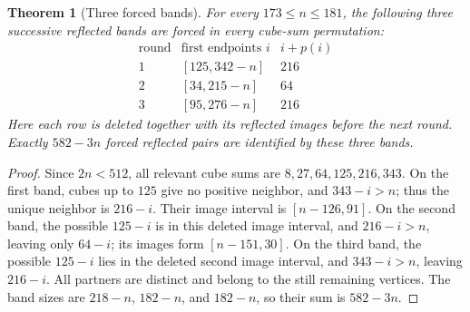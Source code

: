 \documentclass[10pt]{article}
\newtheorem{theorem}{Theorem}
\begin{document}
\begin{theorem}[Three forced bands]
\label{thm:forced-bands}
For every $173\le n\le181$, the following
three successive reflected bands are forced
in \emph{every} cube-sum permutation:
\[
\begin{array}{c|c|c}
\text{round}&\text{first endpoints }i& i+p(i)\\ \hline
1 &[125,342-n]&216\\
2 &[34,215-n]&64\\
3 &[95,276-n]&216
\end{array}
\]
Here each row is deleted together with its
reflected images before the next round.
Exactly $582-3n$ forced reflected pairs are
identified by these three bands.
\end{theorem}
\begin{proof}
Since $2n<512$, all relevant cube sums
are $8,27,64,125,216,343$. On the first
band, cubes up to $125$ give no positive
neighbor, and $343-i>n$; thus the unique
neighbor is $216-i$. Their image interval
is $[n-126,91]$.
On the second band, the possible $125-i$
is in this deleted image interval,
and $216-i>n$, leaving only $64-i$;
its images form $[n-151,30]$.
On the third band, the possible $125-i$
lies in the deleted second image interval,
and $343-i>n$, leaving $216-i$.
All partners are distinct and belong to
the still remaining vertices.
The band sizes are
$218-n$, $182-n$, and $182-n$, so their
sum is $582-3n$.
\end{proof}
\end{document}
